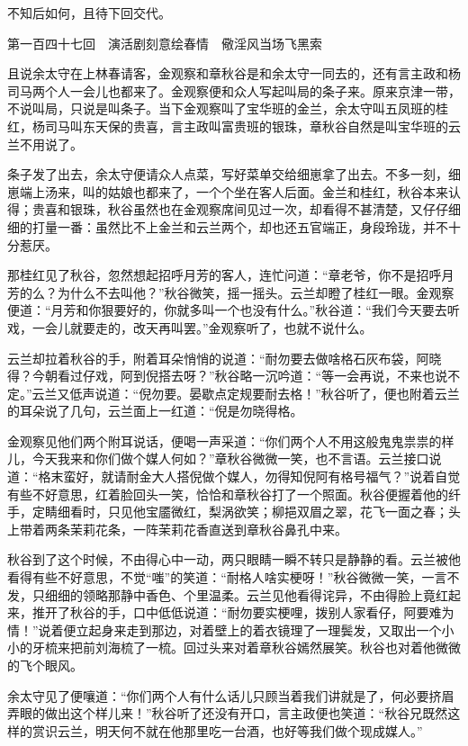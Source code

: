 \documentclass[12pt,UTF8]{ctexbook}
\begin{document}
{{{不知后如何，且待下回交代。





第一百四十七回　演活剧刻意绘春情　儆淫风当场飞黑索





且说余太守在上林春请客，金观察和章秋谷是和余太守一同去的，还有言主政和杨司马两个人一会儿也都来了。金观察便和众人写起叫局的条子来。原来京津一带，不说叫局，只说是叫条子。当下金观察叫了宝华班的金兰，余太守叫五凤班的桂红，杨司马叫东天保的贵喜，言主政叫富贵班的银珠，章秋谷自然是叫宝华班的云兰不用说了。

条子发了出去，余太守便请众人点菜，写好菜单交给细崽拿了出去。不多一刻，细崽端上汤来，叫的姑娘也都来了，一个个坐在客人后面。金兰和桂红，秋谷本来认得；贵喜和银珠，秋谷虽然也在金观察席间见过一次，却看得不甚清楚，又仔仔细细的打量一番：虽然比不上金兰和云兰两个，却也还五官端正，身段玲珑，并不十分惹厌。

那桂红见了秋谷，忽然想起招呼月芳的客人，连忙问道：“章老爷，你不是招呼月芳的么？为什么不去叫他？”秋谷微笑，摇一摇头。云兰却瞪了桂红一眼。金观察便道：“月芳和你狠要好的，你就多叫一个也没有什么。”秋谷道：“我们今天要去听戏，一会儿就要走的，改天再叫罢。”金观察听了，也就不说什么。

云兰却拉着秋谷的手，附着耳朵悄悄的说道：“耐勿要去做啥格石灰布袋，阿晓得？今朝看过仔戏，阿到倪搭去呀？”秋谷略一沉吟道：“等一会再说，不来也说不定。”云兰又低声说道：“倪勿要。晏歇点定规要耐去格！”秋谷听了，便也附着云兰的耳朵说了几句，云兰面上一红道：“倪是勿晓得格。

金观察见他们两个附耳说话，便喝一声采道：“你们两个人不用这般鬼鬼祟祟的样儿，今天我来和你们做个媒人何如？”章秋谷微微一笑，也不言语。云兰接口说道：“格末蛮好，就请耐金大人搭倪做个媒人，勿得知倪阿有格号福气？”说着自觉有些不好意思，红着脸回头一笑，恰恰和章秋谷打了一个照面。秋谷便握着他的纤手，定睛细看时，只见他宝靥微红，梨涡欲笑；柳挹双眉之翠，花飞一面之春；头上带着两条茉莉花条，一阵茉莉花香直送到章秋谷鼻孔中来。

秋谷到了这个时候，不由得心中一动，两只眼睛一瞬不转只是静静的看。云兰被他看得有些不好意思，不觉“嗤”的笑道：“耐格人啥实梗呀！”秋谷微微一笑，一言不发，只细细的领略那静中香色、个里温柔。云兰见他看得诧异，不由得脸上竟红起来，推开了秋谷的手，口中低低说道：“耐勿要实梗哩，拨别人家看仔，阿要难为情！”说着便立起身来走到那边，对着壁上的着衣镜理了一理鬓发，又取出一个小小的牙梳来把前刘海梳了一梳。回过头来对着章秋谷嫣然展笑。秋谷也对着他微微的飞个眼风。

余太守见了便嚷道：“你们两个人有什么话儿只顾当着我们讲就是了，何必要挤眉弄眼的做出这个样儿来！”秋谷听了还没有开口，言主政便也笑道：“秋谷兄既然这样的赏识云兰，明天何不就在他那里吃一台酒，也好等我们做个现成媒人。”

}}}
\end{document}
